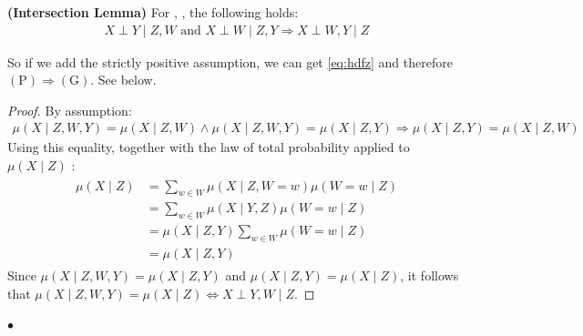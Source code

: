 \documentclass{article}
\newcommand{\bfs}[1]{\textbf{({#1}) }}
\begin{document}
\begin{lema}\bfs{Intersection Lemma}
For , , the following  holds:
\begin{align*}
X \perp Y \mid Z, W   \text { and }  X \perp W \mid Z, Y \Rightarrow X \perp W, Y \mid Z
\end{align*}
\end{lema}
\begin{rema}
So if we add the strictly positive assumption, we can get \cref{eq:hdfz} and therefore $(\mathrm{P}) \Rightarrow(\mathrm{G})$. See below.
\end{rema}
\begin{proof}
By assumption:
\begin{align*}
\mu(X \mid Z, W, Y)=\mu(X \mid Z, W) \wedge \mu(X \mid Z, W, Y)=\mu(X \mid Z, Y) \Longrightarrow \mu(X \mid Z, Y)=\mu(X \mid Z, W)
\end{align*}
Using this equality, together with the law of total probability applied to $\mu(X \mid Z)$ :
\begin{align*}
\begin{aligned}
\mu(X \mid Z) &=\sum_{w \in W} \mu(X \mid Z, W=w) \mu(W=w \mid Z) \\
&=\sum_{w \in W} \mu(X \mid Y, Z) \mu(W=w \mid Z) \\
&=\mu(X \mid Z, Y) \sum_{w \in W} \mu(W=w \mid Z) \\
&=\mu(X \mid Z, Y)
\end{aligned}
\end{align*}
Since $\mu(X \mid Z, W, Y)=\mu(X \mid Z, Y)$ and $\mu(X \mid Z, Y)=\mu(X \mid Z)$, it follows that $\mu(X \mid Z, W, Y)=\mu(X \mid Z) \Longleftrightarrow X \perp Y, W \mid Z$.
\end{proof}

$\bullet$ 
\end{document}
